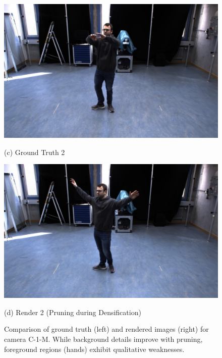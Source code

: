 \begin{figure}[htbp]
    \begin{minipage}[b]{0.48\textwidth}
        \centering
        \includegraphics[width=\linewidth]{bilder/Results/Wang/Prune/C-1-M_000030.jpg}
        \caption*{(c) Ground Truth 2}
    \end{minipage}\hfill
    \begin{minipage}[b]{0.48\textwidth}
        \centering
        \includegraphics[width=\linewidth]{bilder/Results/Wang/Prune/C-1-M_000040.jpg}
        \caption*{(d) Render 2 (Pruning during Densification)}
    \end{minipage}

    \caption{Comparison of ground truth (left) and rendered images (right) for camera C-1-M. 
    While background details improve with pruning, foreground regions (hands) exhibit qualitative weaknesses.}
    \label{fig:4dgs_prune}
\end{figure}

\FloatBarrier

